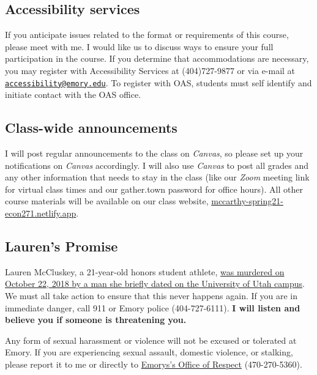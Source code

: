 \documentclass[11pt,]{article}
\begin{document}
\hypertarget{accessibility-services}{%
\subsection{Accessibility services}\label{accessibility-services}}

If you anticipate issues related to the format or requirements of this
course, please meet with me. I would like us to discuss ways to ensure
your full participation in the course. If you determine that
accommodations are necessary, you may register with Accessibility
Services at (404)727-9877 or via e-mail at
\href{mailto:accessibility@emory.edu}{\nolinkurl{accessibility@emory.edu}}.
To register with OAS, students must self identify and initiate contact
with the OAS office.

\hypertarget{class-wide-announcements}{%
\subsection{Class-wide announcements}\label{class-wide-announcements}}

I will post regular announcements to the class on \emph{Canvas}, so
please set up your notifications on \emph{Canvas} accordingly. I will
also use \emph{Canvas} to post all grades and any other information that
needs to stay in the class (like our \emph{Zoom} meeting link for
virtual class times and our gather.town password for office hours). All
other course materials will be available on our class website,
\href{https://mccarthy-spring21-econ372.netlify.app/}{mccarthy-spring21-econ271.netlify.app}.

\hypertarget{laurens-promise}{%
\subsection{Lauren's Promise}\label{laurens-promise}}

Lauren McCluskey, a 21-year-old honors student athlete,
\href{https://www.sltrib.com/opinion/commentary/2019/02/10/commentary-failing-lauren/}{was
murdered on October 22, 2018 by a man she briefly dated on the
University of Utah campus}. We must all take action to ensure that this
never happens again. If you are in immediate danger, call 911 or Emory
police (404-727-6111). \textbf{I will listen and believe you if someone
is threatening you.}

Any form of sexual harassment or violence will not be excused or
tolerated at Emory. If you are experiencing sexual assault, domestic
violence, or stalking, please report it to me or directly to
\href{http://respect.emory.edu/index.html}{Emorys's Office of Respect}
(470-270-5360).
\end{document}
